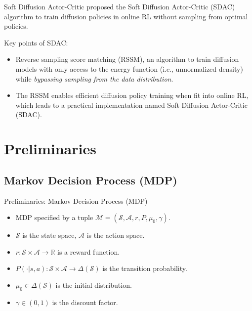 \documentclass[aspectratio=169,xcolor=dvipsnames]{beamer}
\newcommand{\bR}{\mathbb{R}}
\newcommand{\cM}{\mathcal{M}}
\newcommand{\cS}{\mathcal{S}}
\newcommand{\cA}{\mathcal{A}}
\begin{document}

\begin{frame}{Soft Diffusion Actor-Critic \cite{ma2025soft}}
\cite{ma2025soft} proposed the Soft Diffusion Actor-Critic (SDAC) algorithm to train diffusion policies in online RL without sampling from optimal policies. 

Key points of SDAC:
    \begin{itemize}
        \item   Reverse sampling score matching (RSSM), an algorithm to train diffusion models with only access to the energy function (i.e., unnormalized density) while \textit{bypassing sampling from the data distribution}.
        \item  The RSSM enables efficient diffusion policy training when fit into online RL, which
        leads to a practical implementation named Soft Diffusion Actor-Critic (SDAC). 
    \end{itemize}
\end{frame}

\section{Preliminaries}
\subsection{Markov Decision Process (MDP)}
\begin{frame}{Preliminaries: Markov Decision Process (MDP)}
    \begin{itemize}
        \item   MDP specified by a tuple $\cM=(\cS,\cA,r,P,\mu_0,\gamma)$.
        \item  $\cS$ is the state space, $\cA$ is the action space.
        \item $r:\cS\times \cA\rightarrow \bR$ is a reward function.
        \item $P(\cdot|s,a): \cS\times\cA\rightarrow \Delta(\cS)$ is the transition probability.
        \item $\mu_0\in \Delta(\cS)$ is the initial distribution.
        \item $\gamma \in (0,1)$ is the discount factor.
    \end{itemize}
\end{frame}

\end{document}
